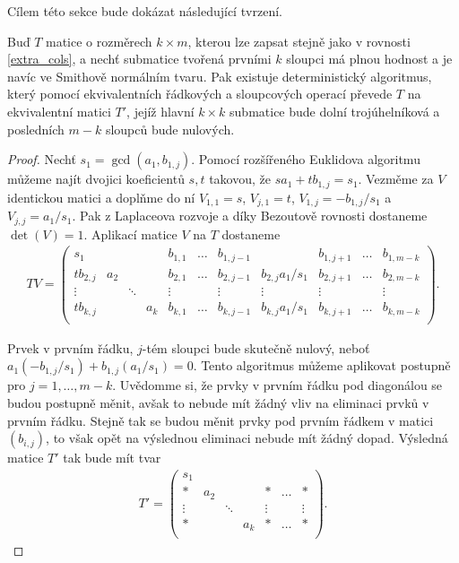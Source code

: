 Cílem této sekce bude dokázat následující tvrzení.
\begin{vet} \label{Zero_extra}
Buď $ T $ matice o rozměrech $ k \times m $, kterou lze zapsat stejně jako
v rovnosti \ref{extra_cols}, a nechť submatice tvořená prvními $ k $ sloupci má
plnou hodnost a je navíc ve Smithově normálním tvaru.
Pak existuje deterministický algoritmus, který pomocí ekvivalentních řádkových
a sloupcových operací převede $ T $ na ekvivalentní matici $ T' $, jejíž
hlavní $ k \times k $ submatice bude dolní trojúhelníková a posledních $ m - k $
sloupců bude nulových.
\end{vet}
\begin{proof}
Nechť $ s_1 = \gcd(a_1, b_{1,j}) $. Pomocí rozšířeného Euklidova algoritmu
můžeme najít dvojici koeficientů $ s, t $ takovou, že
$ s a_1 + t b_{1,j} = s_1 $. Vezměme za $ V $ identickou matici a doplňme do ní
$ V_{1,1} = s $, $ V_{j,1} = t $, $ V_{1,j} = -b_{1,j} / s_1 $ a
$ V_{j,j} = a_1 / s_1 $. Pak z Laplaceova rozvoje a díky Bezoutově rovnosti
dostaneme $ \det(V) = 1 $. Aplikací matice $ V $ na $ T $ dostaneme
\begin{align*}
TV =
    \left(
    \begin{array}{cccc|ccccccc}
        s_1      &     &        &     & b_{1,1} & \hdots & b_{1,j-1} &                   & b_{1,j+1} & \hdots & b_{1,m-k} \\
        tb_{2,j} & a_2 &        &     & b_{2,1} & \hdots & b_{2,j-1} & b_{2,j} a_1 / s_1 & b_{2,j+1} & \hdots & b_{2,m-k} \\
        \vdots   &     & \ddots &     & \vdots  &        & \vdots    & \vdots            & \vdots    &        & \vdots    \\
        tb_{k,j} &     &        & a_k & b_{k,1} & \hdots & b_{k,j-1} & b_{k,j} a_1 / s_1 & b_{k,j+1} & \hdots & b_{k,m-k} \\
    \end{array}
    \right).
\end{align*}

Prvek v prvním řádku, $ j $-tém sloupci bude skutečně nulový, neboť
$ a_1 (-b_{1,j} / s_1) +  b_{1,j} (a_1 / s_1) = 0 $. Tento algoritmus můžeme
aplikovat postupně pro $ j = 1,\dots,m-k $. Uvědomme si, že prvky v prvním řádku
pod diagonálou se budou postupně měnit, avšak to nebude mít žádný vliv na
eliminaci prvků v prvním řádku. Stejně tak se budou měnit prvky pod prvním řádkem
v matici $ (b_{i,j}) $, to však opět na výslednou eliminaci nebude mít žádný
dopad. Výsledná matice $ T' $ tak bude mít tvar
\begin{align*}
T' =
    \left(
    \begin{array}{cccc|ccc}
        s_1    &     &        &     &         &        &           \\
        \ast   & a_2 &        &     & \ast    & \hdots & \ast      \\
        \vdots &     & \ddots &     & \vdots  &        & \vdots    \\
        \ast   &     &        & a_k & \ast    & \hdots & \ast      \\
    \end{array}
    \right).
\end{align*}


\end{proof}

